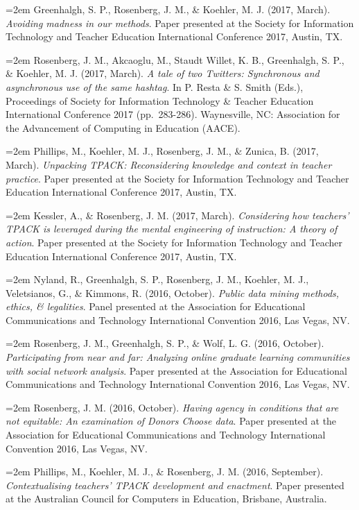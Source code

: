 \documentclass[14,]{article}
\begin{document}
\hangindent=2em Greenhalgh, S. P., Rosenberg, J. M., \& Koehler, M. J.
(2017, March). \emph{Avoiding madness in our methods}. Paper presented
at the Society for Information Technology and Teacher Education
International Conference 2017, Austin, TX.

\hangindent=2em Rosenberg, J. M., Akcaoglu, M., Staudt Willet, K. B.,
Greenhalgh, S. P., \& Koehler, M. J. (2017, March). \emph{A tale of two
Twitters: Synchronous and asynchronous use of the same hashtag}. In P.
Resta \& S. Smith (Eds.), Proceedings of Society for Information
Technology \& Teacher Education International Conference 2017
(pp.~283-286). Waynesville, NC: Association for the Advancement of
Computing in Education (AACE).

\hangindent=2em Phillips, M., Koehler, M. J., Rosenberg, J. M., \&
Zunica, B. (2017, March). \emph{Unpacking TPACK: Reconsidering knowledge
and context in teacher practice}. Paper presented at the Society for
Information Technology and Teacher Education International Conference
2017, Austin, TX.

\hangindent=2em Kessler, A., \& Rosenberg, J. M. (2017, March).
\emph{Considering how teachers' TPACK is leveraged during the mental
engineering of instruction: A theory of action}. Paper presented at the
Society for Information Technology and Teacher Education International
Conference 2017, Austin, TX.

\hangindent=2em Nyland, R., Greenhalgh, S. P., Rosenberg, J. M.,
Koehler, M. J., Veletsianos, G., \& Kimmons, R. (2016, October).
\emph{Public data mining methods, ethics, \& legalities}. Panel
presented at the Association for Educational Communications and
Technology International Convention 2016, Las Vegas, NV.

\hangindent=2em Rosenberg, J. M., Greenhalgh, S. P., \& Wolf, L. G.
(2016, October). \emph{Participating from near and far: Analyzing online
graduate learning communities with social network analysis}. Paper
presented at the Association for Educational Communications and
Technology International Convention 2016, Las Vegas, NV.

\hangindent=2em Rosenberg, J. M. (2016, October). \emph{Having agency in
conditions that are not equitable: An examination of Donors Choose
data}. Paper presented at the Association for Educational Communications
and Technology International Convention 2016, Las Vegas, NV.

\hangindent=2em Phillips, M., Koehler, M. J., \& Rosenberg, J. M. (2016,
September). \emph{Contextualising teachers' TPACK development and
enactment}. Paper presented at the Australian Council for Computers in
Education, Brisbane, Australia.
\end{document}
